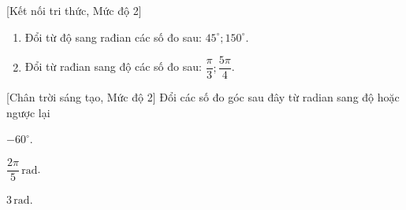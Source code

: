 \begin{bt}%
[Kết nối tri thức, Mức độ 2]
	\begin{enumerate}
		\item Đổi từ độ sang rađian các số đo sau: $45^{\circ} ; 150^{\circ}$.
		\item Đổi từ rađian sang độ các số đo sau: $\dfrac{\pi}{3} ; \dfrac{5 \pi}{4}$.
	\end{enumerate}
\end{bt}

\begin{bt}%
[Chân trời sáng tạo, Mức độ 2]
	Đổi các số đo góc sau đây từ radian sang độ hoặc ngược lại
	\begin{listEX}[3]
		\item $-60^{\circ}$.
		\item $\dfrac{2 \pi}{5}\, \mathrm{rad}$.
		\item $3\, \mathrm{rad}$.
	\end{listEX}
\end{bt}

